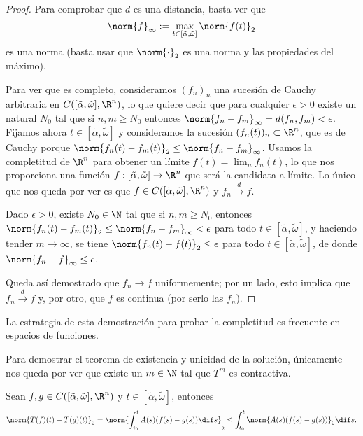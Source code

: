 \documentclass[../ecuaciones_diferenciales.tex]{subfiles}
\begin{document}
\begin{proof}
	Para comprobar que \(d\) es una distancia, basta ver que
	\[\norm{f}_\infty := \max_{t \in [\tilde{\alpha}, \tilde{\omega}]}
		\norm{f(t)}_2\]
	es una norma (basta usar que \(\norm{\cdot}_2\) es una norma y las
	propiedades del máximo).

	Para ver que es completo, consideramos \((f_n)_n\) una sucesión de Cauchy
	arbitraria en \(C([\tilde{\alpha}, \tilde{\omega}], \R^n)\), lo que quiere
	decir que para cualquier \(\epsilon > 0\) existe un natural \(N_0\) tal que
	si \(n, m \geq N_0\) entonces
	\(\norm{f_n-f_m}_\infty = d(f_n, f_m) < \epsilon\). Fijamos ahora
	\(t \in [\tilde{\alpha}, \tilde{\omega}]\) y consideramos la sucesión
	\((f_n(t))_n \subset \R^n\), que es de Cauchy porque
	\(\norm{f_n(t) - f_m(t)}_2 \leq \norm{f_n - f_m}_\infty\). Usamos la
	completitud de \(\R^n\) para obtener un límite \(f(t) = \lim_n f_n(t)\), lo
	que nos proporciona una función \(f: [\tilde{\alpha}, \tilde{\omega}] \to
	\R^n\) que será la candidata a límite. Lo único que nos queda por ver es que
	\(f \in C([\tilde{\alpha}, \tilde{\omega}], \R^n)\) y \(f_n \overset{d}{\to} f\).

	Dado \(\epsilon > 0\), existe \(N_0 \in \N\) tal que si \(n, m \geq N_0\)
	entonces \(\norm{f_n(t) - f_m(t)}_2 \leq \norm{f_n - f_m}_\infty < \epsilon\)
	para todo \(t \in [\tilde{\alpha}, \tilde{\omega}]\), y haciendo tender
	\(m \to \infty\), se tiene \(\norm{f_n(t) - f(t)}_2 \leq \epsilon\) para todo
	\(t \in [\tilde{\alpha}, \tilde{\omega}]\), de donde
	\(\norm{f_n-f}_\infty \leq \epsilon\).

	Queda así demostrado que \(f_n \to f\) uniformemente; por un lado, esto
	implica que \(f_n \overset{d}{\to} f\) y, por otro, que \(f\) es continua
	(por serlo las \(f_n\)).
\end{proof}

\begin{remark}
	La estrategia de esta demostración para probar la completitud es frecuente en
	espacios de funciones.
\end{remark}

Para demostrar el teorema de existencia y unicidad de la solución, únicamente
nos queda por ver que existe un \(m \in \N\) tal que \(T^m\) es contractiva.

Sean \(f, g \in C([\tilde{\alpha}, \tilde{\omega}], \R^n)\) y \(t \in
[\tilde{\alpha}, \tilde{\omega}]\), entonces
\begin{equation}
	\label{eq:contr}
	\norm{T(f)(t) - T(g)(t)}_2 = \norm{\int_{t_0}^tA(s)(f(s)-g(s))\dif s}_2 \leq
	\int_{t_0}^t \norm{A(s)(f(s)-g(s))}_2\dif s.
\end{equation}
\end{document}
